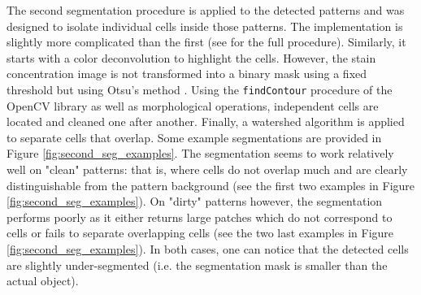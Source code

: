 The second segmentation procedure is applied to the detected patterns and was designed to isolate individual cells inside those patterns. The implementation is slightly more complicated than the first (see \cite{adeblire2013} for the full procedure). Similarly, it starts with a color deconvolution to highlight the cells. However, the stain concentration image is not transformed into a binary mask using a fixed threshold but using Otsu's method \cite{otsu1975threshold}. Using the \texttt{findContour} procedure of the OpenCV library as well as morphological operations, independent cells are located and cleaned one after another. Finally, a watershed algorithm is applied to separate cells that overlap. Some example segmentations are provided in Figure \ref{fig:second_seg_examples}. The segmentation seems to work relatively well on "clean" patterns: that is, where cells do not overlap much and are clearly distinguishable from the pattern background (see the first two examples in Figure \ref{fig:second_seg_examples}). On "dirty" patterns however, the segmentation performs poorly as it either returns large patches which do not correspond to cells or fails to separate overlapping cells (see the two last examples in Figure \ref{fig:second_seg_examples}). In both cases, one can notice that the detected cells are slightly under-segmented (i.e. the segmentation mask is smaller than the actual object).


